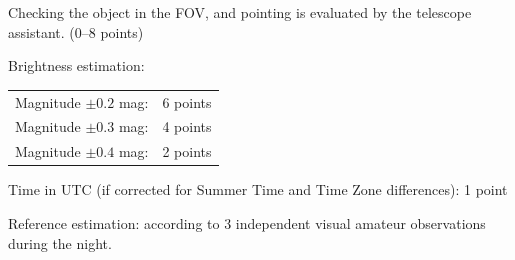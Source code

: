 Checking the object in the FOV, and pointing is evaluated by the telescope
assistant. \hfill(0--8 points)

Brightness estimation:
\begin{center}
\begin{tabular}{ll}
Magnitude $\pm 0.2$ mag: & 6 points \\
Magnitude $\pm 0.3$ mag: & 4 points \\
Magnitude $\pm 0.4$ mag: & 2 points \\
\end{tabular}
\end{center}

Time in UTC (if corrected for Summer Time and Time Zone differences):
\hfill 1 point

Reference estimation: according to 3 independent visual amateur observations
during the night.
